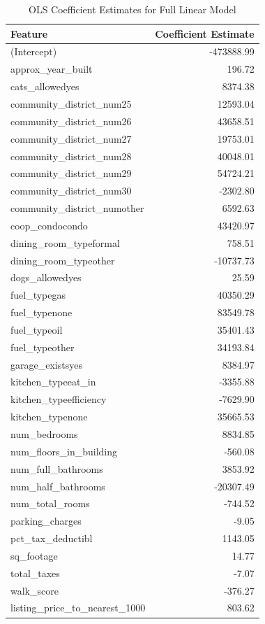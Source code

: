 \documentclass[12pt]{article}
\begin{document}
\begin{table}[H]
\centering
\renewcommand{\arraystretch}{1.2}
\begin{tabular}{|l|r|}
\hline
\textbf{Feature} & \textbf{Coefficient Estimate} \\
\hline
(Intercept) & -473888.99 \\
approx\_year\_built & 196.72 \\
cats\_allowedyes & 8374.38 \\
community\_district\_num25 & 12593.04 \\
community\_district\_num26 & 43658.51 \\
community\_district\_num27 & 19753.01 \\
community\_district\_num28 & 40048.01 \\
community\_district\_num29 & 54724.21 \\
community\_district\_num30 & -2302.80 \\
community\_district\_numother & 6592.63 \\
coop\_condocondo & 43420.97 \\
dining\_room\_typeformal & 758.51 \\
dining\_room\_typeother & -10737.73 \\
dogs\_allowedyes & 25.59 \\
fuel\_typegas & 40350.29 \\
fuel\_typenone & 83549.78 \\
fuel\_typeoil & 35401.43 \\
fuel\_typeother & 34193.84 \\
garage\_existsyes & 8384.97 \\
kitchen\_typeeat\_in & -3355.88 \\
kitchen\_typeefficiency & -7629.90 \\
kitchen\_typenone & 35665.53 \\
num\_bedrooms & 8834.85 \\
num\_floors\_in\_building & -560.08 \\
num\_full\_bathrooms & 3853.92 \\
num\_half\_bathrooms & -20307.49 \\
num\_total\_rooms & -744.52 \\
parking\_charges & -9.05 \\
pct\_tax\_deductibl & 1143.05 \\
sq\_footage & 14.77 \\
total\_taxes & -7.07 \\
walk\_score & -376.27 \\
listing\_price\_to\_nearest\_1000 & 803.62 \\
\hline
\end{tabular}
\caption{OLS Coefficient Estimates for Full Linear Model}
\label{tab:ols_full_coeff}
\end{table}
\end{document}
